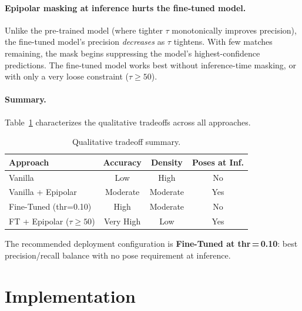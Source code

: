 \documentclass[10pt]{article}
\begin{document}
\paragraph{Epipolar masking at inference hurts the fine-tuned model.}
Unlike the pre-trained model (where tighter $\tau$ monotonically improves precision), the fine-tuned model's precision \emph{decreases} as $\tau$ tightens. With few matches remaining, the mask begins suppressing the model's highest-confidence predictions. The fine-tuned model works best without inference-time masking, or with only a very loose constraint ($\tau \geq 50$).

\paragraph{Summary.}
Table~\ref{tab:summary} characterizes the qualitative tradeoffs across all approaches.

\begin{table}[H]
\centering
\caption{Qualitative tradeoff summary.}
\label{tab:summary}
\small
\setlength{\tabcolsep}{3pt}
\begin{tabular}{lccc}
\toprule
\textbf{Approach} & \textbf{Accuracy} & \textbf{Density} & \textbf{Poses at Inf.} \\
\midrule
Vanilla                  & Low       & High       & No  \\
Vanilla + Epipolar       & Moderate  & Moderate   & Yes \\
Fine-Tuned (thr=0.10)    & High      & Moderate   & No  \\
FT + Epipolar ($\tau\geq50$) & Very High & Low    & Yes \\
\bottomrule
\end{tabular}
\end{table}

The recommended deployment configuration is \textbf{Fine-Tuned at thr\,=\,0.10}: best precision/recall balance with no pose requirement at inference.

\section{Implementation}
\label{sec:impl}
\end{document}
